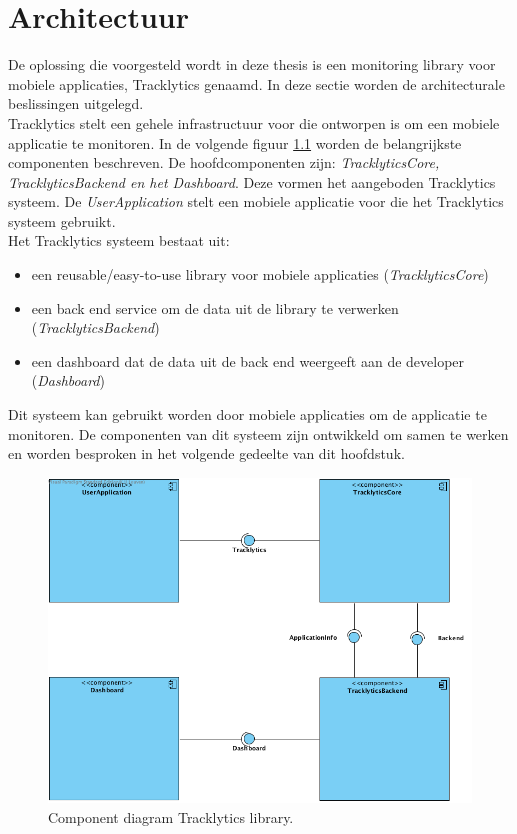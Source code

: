 \chapter{Architectuur}
De oplossing die voorgesteld wordt in deze thesis is een monitoring library voor mobiele applicaties, Tracklytics genaamd. In deze sectie worden de architecturale beslissingen uitgelegd.\\

Tracklytics stelt een gehele infrastructuur voor die ontworpen is om een mobiele applicatie te monitoren. In de volgende figuur \ref{fig:component} worden de belangrijkste componenten beschreven. De hoofdcomponenten zijn: \textit{TracklyticsCore, TracklyticsBackend en het Dashboard}. Deze vormen het aangeboden Tracklytics systeem. De \textit{UserApplication} stelt een mobiele applicatie voor die het Tracklytics systeem gebruikt. \\

Het Tracklytics systeem bestaat uit:
\begin{itemize}
\item een reusable/easy-to-use library voor mobiele applicaties (\textit{TracklyticsCore})
\item een back end service om de data uit de library te verwerken (\textit{TracklyticsBackend})
\item een dashboard dat de data uit de back end weergeeft aan de developer (\textit{Dashboard})
\end{itemize}

Dit systeem kan gebruikt worden door mobiele applicaties om de applicatie te monitoren. De componenten van dit systeem zijn ontwikkeld om samen te werken en worden besproken in het volgende gedeelte van dit hoofdstuk. 


\begin{figure}[!h]
  \centering
  \includegraphics[scale=0.4]{Afbeeldingen/Architectuur/Component}
  \caption{Component diagram Tracklytics library.}
  \label{fig:component}
\end{figure}

